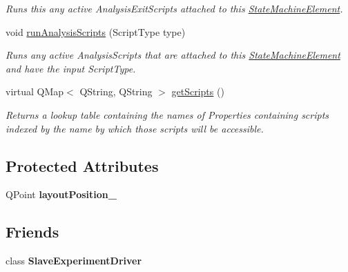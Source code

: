\begin{DoxyCompactItemize}
\begin{DoxyCompactList}\small\item\em Runs this any active Analysis\-Exit\-Scripts attached to this \hyperlink{class_picto_1_1_state_machine_element}{State\-Machine\-Element}. \end{DoxyCompactList}\item 
\hypertarget{class_picto_1_1_state_machine_element_ac283dbb9c98313b2e41e8a894d95baa5}{void \hyperlink{class_picto_1_1_state_machine_element_ac283dbb9c98313b2e41e8a894d95baa5}{run\-Analysis\-Scripts} (Script\-Type type)}\label{class_picto_1_1_state_machine_element_ac283dbb9c98313b2e41e8a894d95baa5}

\begin{DoxyCompactList}\small\item\em Runs any active Analysis\-Scripts that are attached to this \hyperlink{class_picto_1_1_state_machine_element}{State\-Machine\-Element} and have the input Script\-Type. \end{DoxyCompactList}\item 
virtual Q\-Map$<$ Q\-String, Q\-String $>$ \hyperlink{class_picto_1_1_state_machine_element_a2cea850bd3c3e7cd40a0b4b09984db70}{get\-Scripts} ()
\begin{DoxyCompactList}\small\item\em Returns a lookup table containing the names of Properties containing scripts indexed by the name by which those scripts will be accessible. \end{DoxyCompactList}\end{DoxyCompactItemize}
\subsection*{Protected Attributes}
\begin{DoxyCompactItemize}
\item 
\hypertarget{class_picto_1_1_state_machine_element_ac5b97f2b80eee0c2baf6b4511ca6e81e}{Q\-Point {\bfseries layout\-Position\-\_\-}}\label{class_picto_1_1_state_machine_element_ac5b97f2b80eee0c2baf6b4511ca6e81e}

\end{DoxyCompactItemize}
\subsection*{Friends}
\begin{DoxyCompactItemize}
\item 
\hypertarget{class_picto_1_1_state_machine_element_a90c7971ba26fd5050e30ed8ff64e0e29}{class {\bfseries Slave\-Experiment\-Driver}}\label{class_picto_1_1_state_machine_element_a90c7971ba26fd5050e30ed8ff64e0e29}

\end{DoxyCompactItemize}
